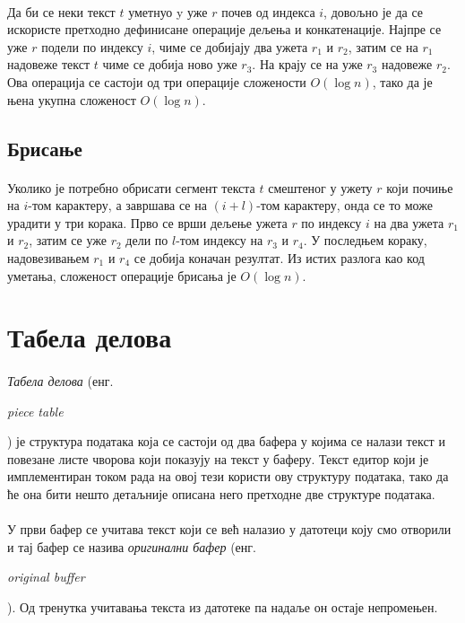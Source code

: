 \documentclass[12pt,oneside]{memoir}
\begin{document}
\paragraph{}
Да би се неки текст \(t\) уметнуо y уже \(r\) почев од индекса \(i\), довољно је да се искористе претходно дефинисане операције дељења и конкатенације. Најпре се уже \(r\)
подели по индексу \(i\), чиме се добијају два ужета \(r_1\) и \(r_2\), затим се на \(r_1\)
надовеже текст \(t\) чиме се добија ново уже \(r_3\). На крају се на уже \(r_3\) надовеже \(r_2\). Ова операција се састоји од три операције сложености \(O(\log{}n)\), тако да је
њена укупна сложеност \(O(\log{}n)\).

\subsection{Брисање}
\paragraph{}
Уколико је потребно обрисати сегмент текста \(t\) смештеног у ужету \(r\) који почиње на \(i\)-том карактеру, а завршава се на \((i+l)\)-том карактеру, онда се то може урадити у три корака. Прво се врши дељење ужета \(r\) по индексу \(i\) на два ужета \(r_1\) и
\(r_2\), затим се уже \(r_2\) дели по \(l\)-том индексу на \(r_3\) и \(r_4\). 
У последњем кораку, надовезивањем \(r_1\) и \(r_4\) се добија коначан резултат. 
Из истих разлога као код уметања, сложеност операције брисања је \(O(\log{}n)\).

\section{Табела делова}
\paragraph{}
\emph{Табела делова} (енг. \begin{latinica}\textit{piece table}\end{latinica}) је структура података која се састоји од два бафера у којима се налази текст и повезане 
листе чворова који показују на текст у баферу. Текст едитор који је имплементиран током
рада на овој тези користи ову структуру података, тако да ће она бити нешто детаљније
описана него претходне две структуре података.

\paragraph{}
У први бафер се учитава текст који се већ налазио у датотеци коју смо отворили и тај 
бафер се назива \emph{оригинални бафер} 
(енг. \begin{latinica}\textit{original buffer}\end{latinica}). 
Од тренутка учитавања текста из датотеке па надаље он остаје непромењен. 
\end{document}
